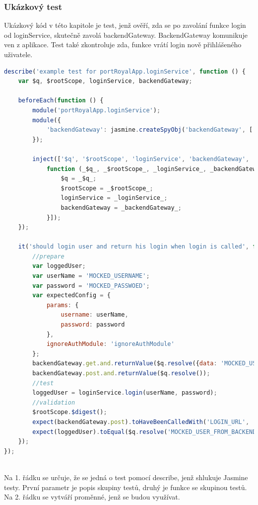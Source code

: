 \documentclass[czech,master,public,dept460,male,cpdeclaration,twoside]{diploma}
\begin{document}
\subsubsection{Ukázkový test}
Ukázkový kód v této kapitole je test, jenž ověří, zda se po zavolání funkce login od loginService, skutečně zavolá backendGateway. BackendGateway komunikuje ven z aplikace. Test také zkontroluje zda, funkce vrátí login nově přihlášeného uživatele.
\\
\begin{lstlisting}[language=JavaScript, caption=Ukázka testu pomocí Jasmine]
describe('example test for portRoyalApp.loginService', function () {
    var $q, $rootScope, loginService, backendGateway;

    beforeEach(function () {
        module('portRoyalApp.loginService');
        module({
            'backendGateway': jasmine.createSpyObj('backendGateway', ['get', 'post'])
        });

        inject(['$q', '$rootScope', 'loginService', 'backendGateway',
            function (_$q_, _$rootScope_, _loginService_, _backendGateway_) {
                $q = _$q_;
                $rootScope = _$rootScope_;
                loginService = _loginService_;
                backendGateway = _backendGateway_;
            }]);
    });

    it('should login user and return his login when login is called', function () {
        //prepare
        var loggedUser;
        var userName = 'MOCKED_USERNAME';
        var password = 'MOCKED_PASSWOED';
        var expectedConfig = {
            params: {
                username: userName,
                password: password
            },
            ignoreAuthModule: 'ignoreAuthModule'
        };
        backendGateway.get.and.returnValue($q.resolve({data: 'MOCKED_USER_FROM_BACKEND'}));
        backendGateway.post.and.returnValue($q.resolve());
        //test
        loggedUser = loginService.login(userName, password);
        //validation
        $rootScope.$digest();
        expect(backendGateway.post).toHaveBeenCalledWith('LOGIN_URL', '', expectedConfig, false, true);
        expect(loggedUser).toEqual($q.resolve('MOCKED_USER_FROM_BACKEND'));
    });
});
\end{lstlisting}
~\\
Na 1. řádku se určuje, že se jedná o test pomocí describe, jenž shlukuje Jasmine testy. První parametr je popis skupiny testů, druhý je funkce se skupinou testů.\\
Na 2. řádku se vytváří proměnné, jenž se budou využívat.
\end{document}
